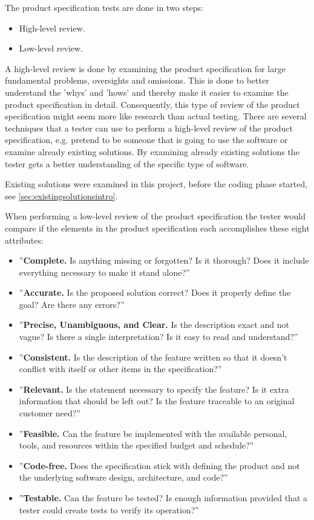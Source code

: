 \documentclass[../../master.tex]{subfiles}
\begin{document}
The product specification tests are done in two steps:
\begin{itemize}
	\item High-level review.
	\item Low-level review.
\end{itemize}

A high-level review is done by examining the product specification for large fundamental problems, oversights and omissions.
This is done to better understand the 'whys' and 'hows' and thereby make it easier to examine the product specification in detail.
Consequently, this type of review of the product specification might seem more like research than actual testing.
There are several techniques that a tester can use to perform a high-level review of the product specification, e.g. pretend to be someone that is going to use the software or examine already existing solutions.
By examining already existing solutions the tester gets a better understanding of the specific type of software. \cite{SoftwareTesting}

Existing solutions were examined in this project, before the coding phase started, see \cref{sec:existingsolutionsintro}.

When performing a low-level review of the product specification the tester would compare if the elements in the product specification each accomplishes these eight attributes: \cite{SoftwareTesting}

\begin{itemize}
	\item ''\textbf{Complete.} Is anything missing or forgotten? Is it thorough? Does it include everything necessary to make it stand alone?''
	\item ''\textbf{Accurate.} Is the proposed solution correct? Does it properly define the goal? Are there any errors?''
	\item ''\textbf{Precise, Unambiguous, and Clear.} Is the description exact and not vague? Is there a single interpretation? Is it easy to read and understand?''
	\item ''\textbf{Consistent.} Is the description of the feature written so that it doesn't conflict with itself or other items in the specification?''
	\item ''\textbf{Relevant.} Is the statement necessary to specify the feature? Is it extra information that should be left out? Is the feature traceable to an original customer need?''
	\item ''\textbf{Feasible.} Can the feature be implemented with the available personal, tools, and resources within the specified budget and schedule?''
	\item ''\textbf{Code-free.} Does the specification stick with defining the product and not the underlying software design, architecture, and code?''
	\item ''\textbf{Testable.} Can the feature be tested? Is enough information provided that a tester could create tests to verify its operation?''
\end{itemize}
\end{document}
